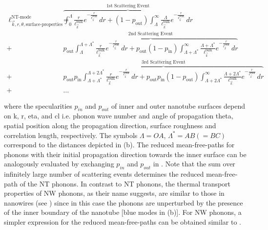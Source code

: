 

\begin{align}\label{eq:nt_mode}
\ell_{\vec{k},r,\theta,\textrm{surface-properties}}^{\textrm{NT-mode}} =
&\overbrace{ \int_{0}^{\Lambda}{\frac{r}{\ell_{\vec{k}}^{\textrm{bulk}}}e^{-\frac{r}{\ell_{\vec{k}}^{\textrm{bulk}}}}\,dr} +(1-p_{\textrm{out}})\int_{\Lambda}^{\infty} {\frac{\Lambda}{\ell_{\vec{k}}^{\textrm{bulk}}}e^{-\frac{r}{\ell_{\vec{k}}^{\textrm{bulk}}}}\,dr} }^\text{1st Scattering Event}  \nonumber \\
+&\overbrace{p_{\textrm{out}} \int_{\Lambda}^{\Lambda+\Lambda^{*}}{\frac{r}{\ell_{\vec{k}}^{\textrm{bulk}}}e^{-\frac{r}{\ell_{\vec{k}}^{\textrm{bulk}}}}\,dr} +p_{\textrm{out}}(1-p_{\textrm{in}})\int_{\Lambda+\Lambda^{*}}^{\infty} {\frac{\Lambda+\Lambda^{*}}{\ell_{\vec{k}}^{\textrm{bulk}}}e^{-\frac{r}{\ell_{\vec{k}}^{\textrm{bulk}}}}\,dr} }^\text{2nd Scattering Event}\nonumber \\
+&\overbrace{p_{\textrm{out}}p_{\textrm{in}} \int_{\Lambda+\Lambda^{*}}^{\Lambda+2\Lambda^{*}}{\frac{r}{\ell_{\vec{k}}^{\textrm{bulk}}}e^{-\frac{r}{\ell_{\vec{k}}^{\textrm{bulk}}}}\,dr} +p_{\textrm{out}}p_{\textrm{in}}(1-p_{\textrm{out}})\int_{\Lambda+2\Lambda^{*}}^{\infty} {\frac{\Lambda+2\Lambda^{*}}{\ell_{\vec{k}}^{\textrm{bulk}}}e^{-\frac{r}{\ell_{\vec{k}}^{\textrm{bulk}}}}\,dr} }^\text{3rd Scattering Event}\nonumber \\
+&{\dots}
\end{align}

where the specularities $p_{in}$ and $p_{out}$ of inner and outer nanotube surfaces depend on \gls{k}, \gls{r}, \gls{eta}, and \gls{cl} i.e. phonon wave number and angle of propagation \gls{theta}, spatial position along the propagation direction, surface roughness and correlation length, respectively. The symbols $\Lambda = OA$, $\Lambda^{*} = AB (=BC)$ correspond to the distances depicted in (b). The reduced mean-free-paths for phonons with their initial propagation direction towards the inner surface can be analogously evaluated by exchanging $p_{in}$ and $p_{out}$ in . Note that the sum over infinitely large number of scattering events determines the reduced mean-free-path of the NT phonons. In contrast to NT phonons, the thermal transport properties of NW phonons, as their name suggests, are similar to those in nanowires (see ) since in this case the phonons are unperturbed by the presence of the inner boundary of the nanotube [blue modes in (b)]. For NW phonons, a simpler expression for the reduced mean-free-paths can be obtained similar to .

